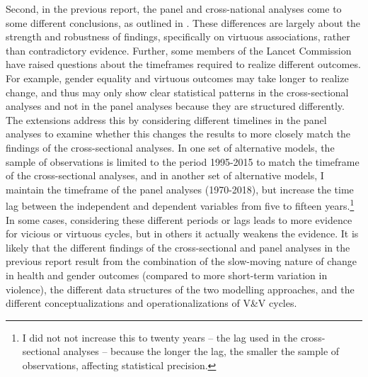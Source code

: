 \documentclass[12pt]{article}
\begin{document}
Second, in the previous report, the panel and cross-national analyses come to some different conclusions, as outlined in . These differences are largely about the strength and robustness of findings, specifically on virtuous associations, rather than contradictory evidence.
Further, some members of the Lancet Commission have raised questions about the timeframes required to realize different outcomes. For example, gender equality and virtuous outcomes may take longer to realize change, and thus may only show clear statistical patterns in the cross-sectional analyses and not in the panel analyses because they are structured differently. The extensions address this by considering different timelines in the panel analyses to examine whether this changes the results to more closely match the findings of the cross-sectional analyses. In one set of alternative models, the sample of observations is limited to the period 1995-2015 to match the timeframe of the cross-sectional analyses, and in another set of alternative models, I maintain the timeframe of the panel analyses (1970-2018), but increase the time lag between the independent and dependent variables from five to fifteen years.\footnote{I did not not increase this to twenty years -- the lag used in the cross-sectional analyses -- because the longer the lag, the smaller the sample of observations, affecting statistical precision.} In some cases, considering these different periods or lags leads to more evidence for vicious or virtuous cycles, but in others it actually weakens the evidence. It is likely that the different findings of the cross-sectional and panel analyses in the previous report result from the combination of the slow-moving nature of change in health and gender outcomes (compared to more short-term variation in violence), the different data structures of the two modelling approaches, and the different conceptualizations and operationalizations of V\&V cycles.
\end{document}
